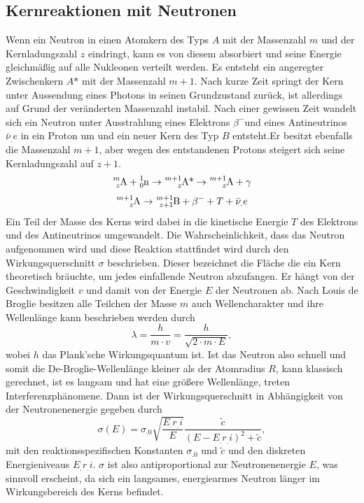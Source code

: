 \subsection{Kernreaktionen mit Neutronen}
\label{sec:Reaktion}
Wenn ein Neutron in einen Atomkern des Typs $A$ mit der Massenzahl $m$
und der Kernladungszahl $z$ eindringt, kann es von diesem absorbiert und seine Energie gleichmäßig auf alle Nukleonen verteilt werden. Es entsteht ein angeregter Zwischenkern $A\text{*}$ mit der Massenzahl $m+1$.\newline
Nach kurze Zeit springt der Kern unter Aussendung eines Photons in seinen Grundzustand zurück, ist allerdings auf Grund der veränderten Massenzahl  instabil. Nach einer gewissen Zeit wandelt sich ein Neutron unter Ausstrahlung eines Elektrons $\beta^-$und eines Antineutrinos $\bar{\nu}_.e$ in ein Proton um und ein neuer Kern des Typ $B$ entsteht.\newline Er besitzt ebenfalls die Massenzahl $m+1$, aber wegen des entstandenen Protons steigert sich seine Kernladungszahl auf $z+1$.
\begin{equation}
\ce{^{m}_{z}A} + \ce{^{1}_{0}n} \rightarrow \ce{^{m+1}_{z}A\text{*}}\rightarrow \ce{^{m+1}_{z}A}+\gamma \label{eq:Anregung}
\end{equation}
\begin{equation}
\ce{^{m+1}_{z}A} \rightarrow \ce{^{m+1}_{z+1}B} + \beta^-+ T + \bar{\nu}_.e\label{eq:Zerfall}
\end{equation}
Ein Teil der Masse des Kerns wird dabei in die kinetische Energie $T$ des Elektrons und des Antineutrinos umgewandelt.\newline
Die Wahrscheinlichkeit, dass das Neutron aufgenommen wird und diese Reaktion stattfindet wird durch den Wirkungsquerschnitt $\sigma$ beschrieben. Dieser bezeichnet die Fläche die ein Kern theoretisch bräuchte, um jedes einfallende Neutron abzufangen.
Er hängt von der Geschwindigkeit $v$ und damit von der Energie $E$ der Neutronen ab.
Nach Louis de Broglie besitzen alle Teilchen der Masse $m$ auch Wellencharakter und ihre Wellenlänge kann beschrieben werden durch
\[
\lambda=\frac{h}{m\cdot v}=\frac{h}{\sqrt{2\cdot m\cdot E}},
\]
wobei $h$ das Plank'sche Wirkungsquantum ist.
Ist das Neutron also schnell und somit die De-Broglie-Wellenlänge kleiner als der Atomradius $R$, kann klassisch gerechnet,
ist es langsam und hat eine größere Wellenlänge, treten Interferenzphänomene.
Dann ist der Wirkungsquerschnitt in Abhängigkeit von der Neutronenenergie gegeben durch
\begin{equation}
\sigma(E) = \sigma_.0\sqrt{\frac{E_.{r_.i}}{E}}\frac{\tilde{c}}{\left(E-E_.{r_.i}\right)^2+\tilde{c}},
\end{equation}
mit den reaktionsspezifischen Konstanten $\sigma_.0$ und $\tilde{c}$
und den diskreten Energieniveaus $E_.{r_.i}$.
$\sigma$ ist also antiproportional zur Neutronenenergie $E$, was sinnvoll erscheint, da sich ein langsames, energiearmes Neutron länger im Wirkungsbereich des Kerns befindet.

